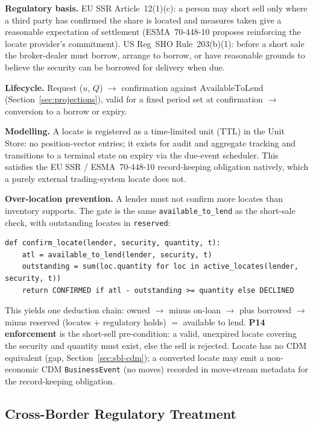 \documentclass[11pt,a4paper]{article}
\begin{document}
\noindent\textbf{Regulatory basis.} EU SSR Article~12(1)(c): a person may short sell only where a third party has confirmed the share is located and measures taken give a reasonable expectation of settlement (ESMA~70-448-10 proposes reinforcing the locate provider's commitment). US Reg~SHO Rule~203(b)(1): before a short sale the broker-dealer must borrow, arrange to borrow, or have reasonable grounds to believe the security can be borrowed for delivery when due.

\noindent\textbf{Lifecycle.} Request ($u$, $Q$) $\to$ confirmation against $\text{AvailableToLend}$ (Section~\ref{sec:projections}), valid for a fixed period set at confirmation $\to$ conversion to a borrow or expiry.

\noindent\textbf{Modelling.} A locate is registered as a time-limited unit (TTL) in the Unit Store: no position-vector entries; it exists for audit and aggregate tracking and transitions to a terminal state on expiry via the due-event scheduler. This satisfies the EU SSR / ESMA~70-448-10 record-keeping obligation natively, which a purely external trading-system locate does not.

\noindent\textbf{Over-location prevention.} A lender must not confirm more locates than inventory supports. The gate is the same \texttt{available\_to\_lend} as the short-sale check, with outstanding locates in \texttt{reserved}:
\begin{lstlisting}
def confirm_locate(lender, security, quantity, t):
    atl = available_to_lend(lender, security, t)
    outstanding = sum(loc.quantity for loc in active_locates(lender, security, t))
    return CONFIRMED if atl - outstanding >= quantity else DECLINED
\end{lstlisting}
This yields one deduction chain: owned $\to$ minus on-loan $\to$ plus borrowed $\to$ minus reserved (locates + regulatory holds) $=$ available to lend. \textbf{P14 enforcement} is the short-sell pre-condition: a valid, unexpired locate covering the security and quantity must exist, else the sell is rejected. Locate has no CDM equivalent (gap, Section~\ref{sec:sbl-cdm}); a converted locate may emit a non-economic CDM \texttt{BusinessEvent} (no moves) recorded in move-stream metadata for the record-keeping obligation.

\subsection{Cross-Border Regulatory Treatment}
\label{sec:sbl-crossborder}
\end{document}
